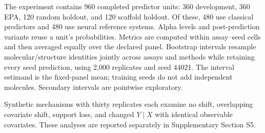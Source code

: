 The experiment contains 960 completed predictor units: 360 development, 360 EPA, 120 random holdout, and 120 scaffold holdout. Of these, 480 use classical predictors and 480 use neural reference systems. Alpha levels and post-prediction variants reuse a unit's probabilities. Metrics are computed within assay--seed cells and then averaged equally over the declared panel. Bootstrap intervals resample molecular/structure identities jointly across assays and methods while retaining every seed prediction, using 2,000 replicates and seed 44021. The interval estimand is the fixed-panel mean; training seeds do not add independent molecules. Secondary intervals are pointwise exploratory.

Synthetic mechanisms with thirty replicates each examine no shift, overlapping covariate shift, support loss, and changed $Y\mid X$ with identical observable covariates. These analyses are reported separately in Supplementary Section S5.



